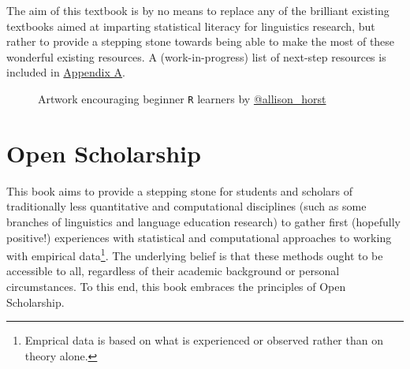 \documentclass[
  letterpaper,
  DIV=11,
  numbers=noendperiod,
  oneside]{scrreprt}
\begin{document}
The aim of this textbook is by no means to replace any of the brilliant
existing textbooks aimed at imparting statistical literacy for
linguistics research, but rather to provide a stepping stone towards
being able to make the most of these wonderful existing resources. A
(work-in-progress) list of next-step resources is included in
\href{https://elenlefoll.github.io/RstatsTextbook/FurtherResources.html}{Appendix
A}.

\begin{figure}


\caption{\label{fig-WeBelieveinYou}Artwork encouraging beginner
\texttt{R} learners by
\href{https://allisonhorst.com/allison-horst}{@allison\_horst}}

\end{figure}%


\chapter{Open Scholarship}\label{open-scholarship}

This book aims to provide a stepping stone for students and scholars of
traditionally less quantitative and computational disciplines (such as
some branches of linguistics and language education research) to gather
first (hopefully positive!) experiences with statistical and
computational approaches to working with empirical data\footnote{Emprical
  data is based on what is experienced or observed rather than on theory
  alone.}. The underlying belief is that these methods ought to be
accessible to all, regardless of their academic background or personal
circumstances. To this end, this book embraces the principles of Open
Scholarship.
\end{document}
